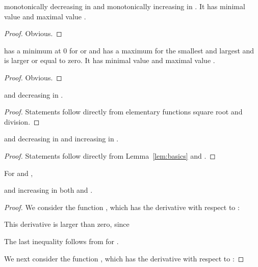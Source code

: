\documentclass{article}
\begin{document}
\begin{lemma}[Function ]
\label{lem:xx3}


monotonically decreasing in  and monotonically increasing in .
It has minimal value  and maximal value
.
\end{lemma}
\begin{proof}
Obvious.
\end{proof}

\begin{lemma}[Function ]
\label{lem:xx4}


has a minimum at 0 for  or  and has a maximum for
the smallest   and largest  and is larger or equal to zero.
It has minimal value  and maximal value
.
\end{lemma}
\begin{proof}
Obvious.
\end{proof}


\begin{lemma}[Function ]
\label{lem:F1}


and decreasing in .
\end{lemma}
\begin{proof}
Statements follow directly from elementary functions square root and
division.
\end{proof}

\begin{lemma}[Function ]
\label{lem:F2}


and decreasing in  and increasing in 
.
\end{lemma}
\begin{proof}
Statements follow directly from Lemma~\ref{lem:basics} and .
\end{proof}

\begin{lemma}[Function ]
\label{lem:F3}

For  and ,
 
and increasing in both  and .
\end{lemma}
\begin{proof}
We consider the function
    , 
which has the derivative with respect to :

This derivative is larger than zero, since 

The last inequality follows from 
 for .

We next consider the function
,
which  has the derivative with respect to :

\end{proof}
\end{document}
